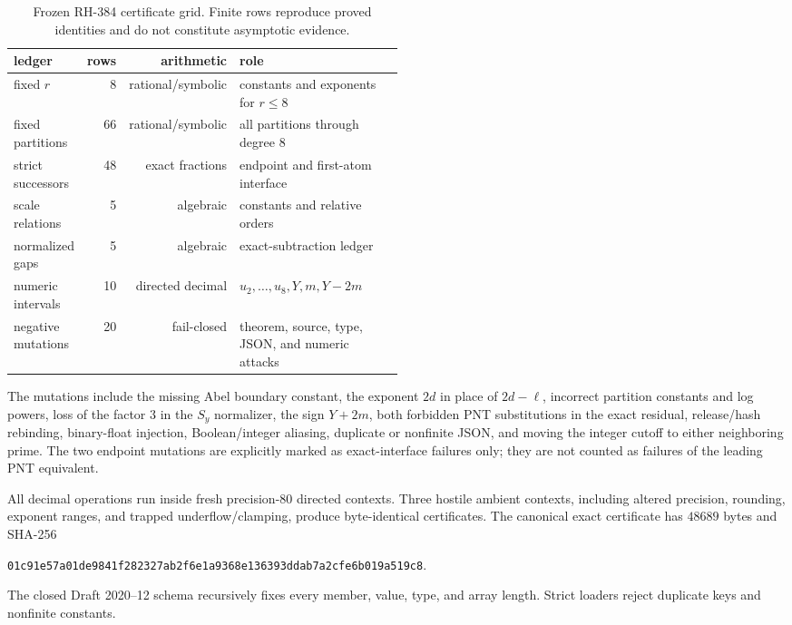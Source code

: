 \documentclass[11pt]{article}
\theoremstyle{definition}
\theoremstyle{remark}
\begin{document}
\begin{table}[ht]
\centering
\small
\begin{tabular}{@{}lrrp{0.50\linewidth}@{}}
\toprule
ledger & rows & arithmetic & role \\
\midrule
fixed $r$ & 8 & rational/symbolic & constants and exponents for $r\le8$ \\
fixed partitions & 66 & rational/symbolic & all partitions through degree $8$ \\
strict successors & 48 & exact fractions & endpoint and first-atom interface \\
scale relations & 5 & algebraic & constants and relative orders \\
normalized gaps & 5 & algebraic & exact-subtraction ledger \\
numeric intervals & 10 & directed decimal & $u_2,\ldots,u_8,Y,m,Y-2m$ \\
negative mutations & 20 & fail-closed & theorem, source, type, JSON, and numeric attacks \\
\bottomrule
\end{tabular}
\caption{Frozen RH-384 certificate grid.  Finite rows reproduce proved
identities and do not constitute asymptotic evidence.}
\label{tab:certificate}
\end{table}

The mutations include the missing Abel boundary constant, the exponent
$2d$ in place of $2d-\ell$, incorrect partition constants and log powers,
loss of the factor $3$ in the $S_y$ normalizer, the sign $Y+2m$, both
forbidden PNT substitutions in the exact residual, release/hash rebinding,
binary-float injection, Boolean/integer aliasing, duplicate or nonfinite
JSON, and moving the integer cutoff to either neighboring prime.  The two
endpoint mutations are explicitly marked as exact-interface failures only;
they are not counted as failures of the leading PNT equivalent.

All decimal operations run inside fresh precision-$80$ directed contexts.
Three hostile ambient contexts, including altered precision, rounding,
exponent ranges, and trapped underflow/clamping, produce byte-identical
certificates.  The canonical exact certificate has $48689$ bytes and
SHA-256
\begin{center}
\texttt{01c91e57a01de9841f282327ab2f6e1a9368e136393ddab7a2cfe6b019a519c8}.
\end{center}
The closed Draft 2020--12 schema recursively fixes every member, value,
type, and array length.  Strict loaders reject duplicate keys and nonfinite
constants.
\end{document}
